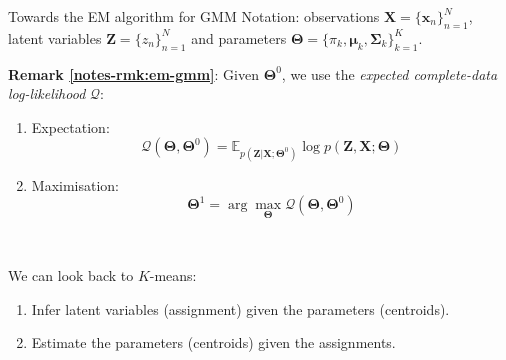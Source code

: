 \documentclass{beamer}
\newcommand{\bs}[1]{\boldsymbol{#1}}
\newcommand{\remark}[2]{\noindent\colorbox{red!10}{\parbox{0.995\textwidth}{\textbf{Remark \ref{notes-rmk:#1}}: #2}}\\}
\begin{document}
\begin{frame}{Towards the EM algorithm for GMM}
 Notation: observations $\bs{X}=\{\bs{x}_n\}_{n=1}^N$, latent variables $\bs{Z}=\{z_n\}_{n=1}^N$ and parameters $\bs{\Theta}=\{\pi_k,\bs{\mu}_k,\bs{\Sigma}_k\}_{k=1}^K$.\vspace{4mm}\\\pause
 
 \remark{em-gmm}{Given $\bs{\Theta}^0$, we use the \textit{expected complete-data log-likelihood} $\mathcal{Q}$:\vspace{2mm}
 \begin{enumerate}
  \item Expectation: \vspace{-9mm} 
  \[ \mathcal{Q}(\bs{\Theta},\bs{\Theta}^0) = \mathbb{E}_{p(\bs{Z}|\bs{X};\bs{\Theta}^0)} \log p(\bs{Z},\bs{X};\bs{\Theta})\]\vspace{-5mm}
  \item Maximisation: \vspace{-5mm} 
  \[ \bs{\Theta}^1 = \arg\max_{\bs{\Theta}} \mathcal{Q}(\bs{\Theta},\bs{\Theta}^0)\]
 \end{enumerate}}\pause\vspace{4mm}
 
  We can look back to $K$-means:
 \begin{enumerate}
  \item Infer latent variables (assignment) given the parameters (centroids).
  \item Estimate the parameters (centroids) given the assignments.
 \end{enumerate} 
\end{frame}
\end{document}
